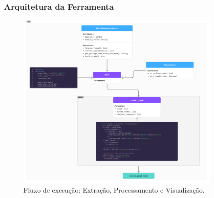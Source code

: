 \documentclass{beamer}
\begin{document}
\begin{frame}
  \frametitle{Arquitetura da Ferramenta}

  \begin{figure}
    \includegraphics[width=0.9\textwidth]{images/diagrama_classes.png}
    \caption{Fluxo de execução: Extração, Processamento e Visualização.}
  \end{figure}
\end{frame}
\end{document}
